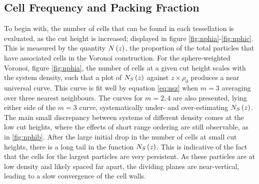 \subsection{Cell Frequency and Packing Fraction}
\label{s:polycell}

To begin with, the number of cells that can be found in each tessellation is evaluated, as the cut height is increased; displayed in figure \ref{fig:nphia}\--\ref{fig:nphic}.
This is measured by the quantity $N\left(z\right)$, the proportion of the total particles that have associated cells in the Voronoi construction.
For the sphere\--weighted Voronoi, figure \ref{fig:nphia}, the number of cells at a given cut height scales with the system density, such that a plot of $N_S\left(z\right)$ against $z\times \rho_0$ produces a near universal curve.
This curve is fit well by equation \eqref{eq:nsz} when $m=3$ \ie{} averaging over three nearest neighbours.
The curves for $m=2,4$ are also presented, lying either side of the $m=3$ curve, systematically under\-- and over\--estimating $N_S\left(z\right)$.
The main small discrepancy between systems of different density comes at the low cut heights, where the effects of short range ordering are still observable, as in \ref{fig:nphib}.
After the large initial drop in the number of cells at small cut heights, there is a long tail in the function $N_S\left(z\right)$.
This is indicative of the fact that the cells for the largest particles are very persistent.
As these particles are at low density and likely spaced far apart, the dividing planes are near\--vertical, leading to a slow convergence of the cell walls.

